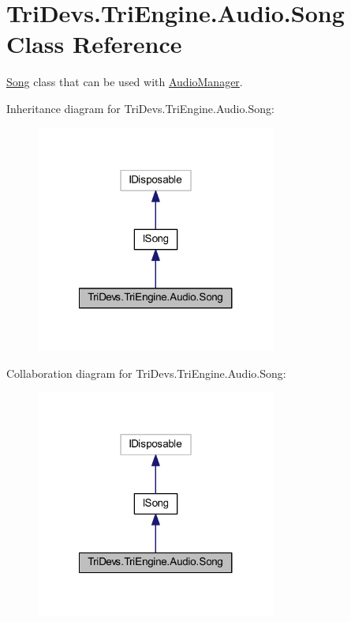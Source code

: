 \hypertarget{class_tri_devs_1_1_tri_engine_1_1_audio_1_1_song}{\section{Tri\-Devs.\-Tri\-Engine.\-Audio.\-Song Class Reference}
\label{class_tri_devs_1_1_tri_engine_1_1_audio_1_1_song}
}


\hyperlink{class_tri_devs_1_1_tri_engine_1_1_audio_1_1_song}{Song} class that can be used with \hyperlink{class_tri_devs_1_1_tri_engine_1_1_audio_1_1_audio_manager}{Audio\-Manager}.  




Inheritance diagram for Tri\-Devs.\-Tri\-Engine.\-Audio.\-Song\-:
\nopagebreak
\begin{figure}[H]
\begin{center}
\leavevmode
\includegraphics[width=224pt]{class_tri_devs_1_1_tri_engine_1_1_audio_1_1_song__inherit__graph}
\end{center}
\end{figure}


Collaboration diagram for Tri\-Devs.\-Tri\-Engine.\-Audio.\-Song\-:
\nopagebreak
\begin{figure}[H]
\begin{center}
\leavevmode
\includegraphics[width=224pt]{class_tri_devs_1_1_tri_engine_1_1_audio_1_1_song__coll__graph}
\end{center}
\end{figure}
